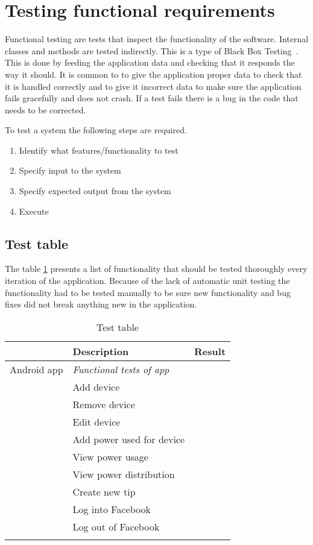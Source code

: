 \section{Testing functional requirements}
\label{sec:funcTest}
Functional testing are tests that inspect the functionality of the software. Internal classes and methods are tested indirectly. This is a type of Black Box Testing~\cite{blackbox}. This is done by feeding the application data and checking that it responds the way it should. It is common to to give the application proper data to check that it is handled correctly and to give it incorrect data to make sure the application fails gracefully and does not crash. If a test fails there is a bug in the code that needs to be corrected.

To test a system the following steps are required.
\begin{enumerate}
\item Identify what features/functionality to test
\item Specify input to the system
\item Specify expected output from the system
\item Execute
\end{enumerate}

\subsection{Test table}
The table \ref{tab:testTable} presents a list of functionality that should be tested thoroughly every iteration of the application. Because of the lack of automatic unit testing the functionality had to be tested manually to be sure new functionality and bug fixes did not break anything new in the application.

\begin{table}[H]
\begin{tabular}{|l|l|l|}
\hline
\rowcolor{darkgray} & \textbf{Description} & \textbf{Result}\\\hline \arrayrulecolor{lightgray}
\rowcolors{0}{darkgray}{lightgray}
Android app & \textit{Functional tests of app} &  \\ \cline{1-2}\cline{2-3}
&Add device&\\ \cline{1-2}\cline{2-3}
&Remove device&\\ \cline{1-2}\cline{2-3}
&Edit device&\\ \cline{1-2}\cline{2-3}
&Add power used for device&\\ \cline{1-2}\cline{2-3}
&View power usage&\\ \cline{1-2}\cline{2-3}
&View power distribution&\\ \cline{1-2}\cline{2-3}
&Create new tip&\\ \cline{1-2}\cline{2-3}
&Log into Facebook&\\ \cline{1-2}\cline{2-3}
&Log out of Facebook&\\\arrayrulecolor{black}
\hline
\end{tabular}
\caption{Test table}
\label{tab:testTable}
\end{table}


